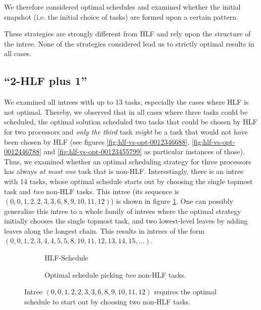 We therefore considered optimal schedules and examined whether the initial snapshot (i.e. the initial choice of tasks) are formed upon a certain pattern.

These strategies are strongly different from HLF and rely upon the structure of the intree. None of the strategies considered lead us to strictly optimal results in all cases.

\subsection{``2-HLF plus 1''}
\label{sec:disproving-2hlf-plus-1}

We examined all intrees with up to 13 tasks, especially the cases where HLF is not optimal. Thereby, we observed that in all cases where three tasks could be scheduled, the optimal solution scheduled two tasks that could be chosen by HLF for two processors and \emph{only the third} task \emph{might} be a task that would not have been chosen by HLF (see figures \ref{fig:hlf-vs-opt-0012346688}, \ref{fig:hlf-vs-opt-0012446788} and \ref{fig:hlf-vs-opt-00123455799} as particular instances of those). Thus, we examined whether an optimal scheduling strategy for three processors has always \emph{at most one} task that is non-HLF. Interestingly, there is an intree with 14 tasks, whose optimal schedule starts out by choosing the single topmost task and \emph{two} non-HLF tasks. This intree (its sequence is $(0,0,1,2,2,3,3,6,8,9,10,11,12)$) is shown in figure \ref{fig:2-hlf-plus-one-not-optimal}. One can possibly generalize this intree to a whole family of intrees where the optimal strategy initially chooses the single topmost task, and two lowest-level leaves by adding leaves along the longest chain. This results in intrees of the form $(0, 0, 1, 2, 3, 4, 4, 5, 5, 8, 10, 11, 12, 13, 14, 15,\dots)$.

\begin{figure}[ht]
  \centering
  \begin{subfigure}{.5\textwidth}
    \centering
    
    \caption{HLF-Schedule}
  \end{subfigure}
  \quad
  \begin{subfigure}{.40\textwidth}
    \centering
    
    \caption{Optimal schedule picking \emph{two} non-HLF tasks.}
  \end{subfigure}
  \caption{Intree $(0,0,1,2,2,3,3,6,8,9,10,11,12)$ requires the optimal schedule to start out by choosing two non-HLF tasks.}
  \label{fig:2-hlf-plus-one-not-optimal}
\end{figure}

